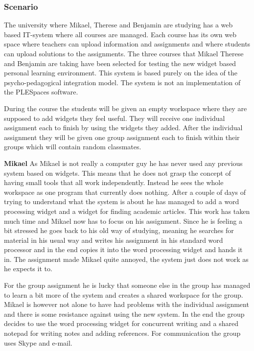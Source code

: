 \subsubsection {Scenario}
The university where Mikael, Therese and Benjamin are studying has a web based IT-system where all courses are managed. Each course has its own web space where teachers can upload information and assignments and where students can upload solutions to the assignments. The three courses that Mikael Therese and Benjamin are taking have been selected for testing the new widget based personal learning environment. This system is based purely on the idea of the psycho-pedagogical integration model. The system is not an implementation of the PLESpaces software.

During the course the students will be given an empty workspace where they are supposed to add widgets they feel useful. They will receive one individual assignment each to finish by using the widgets they added. After the individual assignment they will be given one group assignment each to finish within their groups which will contain random classmates.

\textbf{Mikael} As Mikael is not really a computer guy he has never used any previous system based on widgets. This means that he does not grasp the concept of having small tools that all work independently. Instead he sees the whole workspace as one program that currently does nothing. After a couple of days of trying to understand what the system is about he has managed to add a word processing widget and a widget for finding academic articles. This work has taken much time and Mikael now has to focus on his assignment. Since he is feeling a bit stressed he goes back to his old way of studying, meaning he searches for material in his usual way and writes his assignment in his standard word processor and in the end copies it into the word processing widget and hands it in. The assignment made Mikael quite annoyed, the system just does not work as he expects it to.

For the group assignment he is lucky that someone else in the group has managed to learn a bit more of the system and creates a shared workspace for the group. Mikael is however not alone to have had problems with the individual assignment and there is some resistance against using the new system. In the end the group decides to use the word processing widget for concurrent writing and a shared notepad for writing notes and adding references. For communication the group uses Skype and e-mail.

